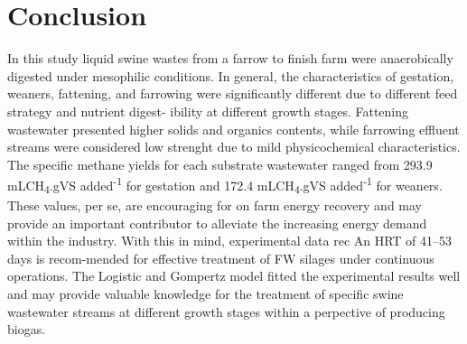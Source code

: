 \section{Conclusion}
In this study liquid swine wastes from a farrow to finish farm were anaerobically digested under mesophilic conditions. In general, the characteristics of gestation, weaners, fattening, and farrowing were significantly different due to different feed strategy and nutrient digest- ibility at different growth stages. Fattening wastewater presented higher solids and organics contents, while farrowing effluent streams were considered low strenght due to mild physicochemical characteristics. The specific methane yields for each substrate wastewater ranged from 293.9 mLCH\textsubscript{4}.gVS added\textsuperscript{-1} for gestation and 172.4 mLCH\textsubscript{4}.gVS added\textsuperscript{-1} for weaners. These values, per se, are encouraging for on farm energy recovery and may provide an important contributor to alleviate the increasing energy demand within the industry. With this in mind, experimental data rec An HRT of 41–53 days is recom-mended for effective treatment of FW silages under continuous operations. The Logistic and Gompertz model fitted the experimental results well and may provide valuable knowledge for the treatment of specific swine wastewater streams at different growth stages within a perpective of producing biogas.